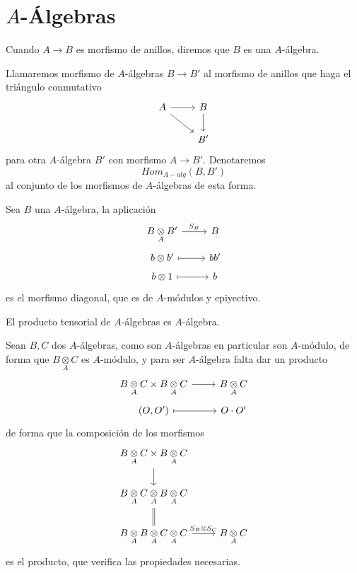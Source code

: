 \section{$A$-\'Algebras}
\begin{defi}
    Cuando $A \longrightarrow B$ es morfismo de anillos, diremos que $B$ es una $A$-\'algebra. 

    Llamaremos morfismo de $A$-\'algebras $B \longrightarrow B'$ al morfismo de anillos que haga el tri\'angulo conmutativo
    $$\bt A \arrow{r} \arrow{dr} & B \arrow{d} \\ & B' \et$$
    para otra $A$-\'algebra $B'$ con morfismo $A\longrightarrow B'$. Denotaremos 
    $$Hom_{A-alg}(B,B')$$
    al conjunto de los morfismos de $A$-\'algebras de esta forma.
\end{defi}
\begin{obs}
    Sea $B$ una $A$-\'algebra, la aplicaci\'on
    $$\bt B\underset{A}{\otimes} B' \arrow{r}{S_B} & B \\[-5mm] b \otimes b' \arrow[mapsto]{r} & bb' \\[-5mm] b\otimes 1 \arrow[mapsto]{r} & b\et$$
    es el morfismo diagonal, que es de $A$-m\'odulos y epiyectivo. 
\end{obs}
\begin{prop}
    El producto tensorial de $A$-\'algebras es $A$-\'algebra. 
\end{prop}
\begin{dem}
    Sean $B, C$ dos $A$-\'algebras, como son $A$-\'algebras en particular son $A$-m\'odulo, de forma que $B\underset{A}{\otimes} C$ es $A$-m\'odulo, y para ser $A$-\'algebra falta dar un producto
    $$\bt B\underset{A}{\otimes} C  \times B\underset{A}{\otimes} C \arrow{r} & B\underset{A}{\otimes} C  \\[-5mm] (O,O') \arrow[mapsto]{r} & O \cdot O' \et$$
    de forma que la composici\'on de los morfismos
    $$\bt B\underset{A}{\otimes} C  \times B\underset{A}{\otimes} C  \arrow{d} \\ B\underset{A}{\otimes} C  \underset{A}{\otimes} B\underset{A}{\otimes} C \arrow[equal]{d} \\ B\underset{A}{\otimes} B  \underset{A}{\otimes} C\underset{A}{\otimes} C \arrow{r}{S_B \otimes S_C} & B \underset{A}{\otimes} C \et$$
    es el producto, que verifica las propiedades necesarias.
\end{dem}
